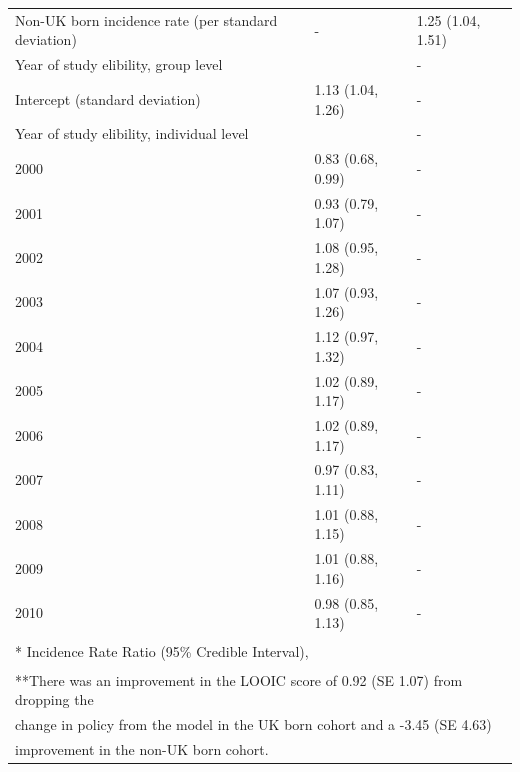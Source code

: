 \documentclass[11pt,twoside]{bristolthesis}
\begin{document}
\begin{table}[!h]
\begin{tabular}{lll}
  Non-UK born incidence rate (per standard deviation) & - & 1.25 (1.04, 1.51)\\
  Year of study elibility, group level &  & -\\
  \hspace{1em}Intercept (standard deviation) & 1.13 (1.04, 1.26) & -\\
  Year of study elibility, individual level &  & -\\
  \addlinespace
  \hspace{1em}2000 & 0.83 (0.68, 0.99) & -\\
  \hspace{1em}2001 & 0.93 (0.79, 1.07) & -\\
  \hspace{1em}2002 & 1.08 (0.95, 1.28) & -\\
  \hspace{1em}2003 & 1.07 (0.93, 1.26) & -\\
  \hspace{1em}2004 & 1.12 (0.97, 1.32) & -\\
  \addlinespace
  \hspace{1em}2005 & 1.02 (0.89, 1.17) & -\\
  \hspace{1em}2006 & 1.02 (0.89, 1.17) & -\\
  \hspace{1em}2007 & 0.97 (0.83, 1.11) & -\\
  \hspace{1em}2008 & 1.01 (0.88, 1.15) & -\\
  \hspace{1em}2009 & 1.01 (0.88, 1.16) & -\\
  \addlinespace
  \hspace{1em}2010 & 0.98 (0.85, 1.13) & -\\
  \bottomrule
  \multicolumn{3}{l}{\textsuperscript{} * Incidence Rate Ratio (95\% Credible Interval),}\\
  \multicolumn{3}{l}{\textsuperscript{} **There was an improvement in the LOOIC score of 0.92 (SE 1.07) from dropping the}\\
  \multicolumn{3}{l}{change in policy from the model in the UK born cohort and a -3.45 (SE 4.63)}\\
  \multicolumn{3}{l}{improvement in the non-UK born cohort.}\\
  \end{tabular}
  \end{table}
\end{document}

